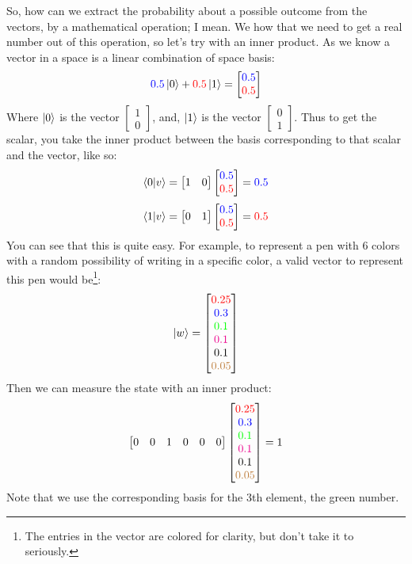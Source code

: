 So, how can we extract the probability about a possible outcome from the vectors, by a mathematical operation; I mean. We how that we need to get a real number out of this operation, so let's try with an inner product.
As we know a vector in a space is a linear combination of space basis:
$$
\textcolor{blue}{0.5}\ket{0} + \textcolor{red}{0.5}\ket{1} = \begin{bmatrix}
	\textcolor{blue}{0.5} \\
	\textcolor{red}{0.5}
\end{bmatrix}
$$
Where $\ket{0}$ is the vector $\begin{bmatrix} 1 \\ 0\end{bmatrix}$, and, $\ket{1}$ is the vector $\begin{bmatrix} 0 \\ 1 \end{bmatrix}$. Thus to get the scalar, you take the inner product between the basis corresponding to that scalar and the vector, like so:
$$
\bra{0}\ket{v} =
\begin{bmatrix}
	1 &
	0
\end{bmatrix}
\begin{bmatrix}
	\textcolor{blue}{0.5} \\
	\textcolor{red}{0.5}
\end{bmatrix}
= \textcolor{blue}{0.5}
$$
$$
\bra{1}\ket{v} =
	\begin{bmatrix}
		0 &
		1
	\end{bmatrix}
	\begin{bmatrix}
		\textcolor{blue}{0.5} \\
		\textcolor{red}{0.5}
	\end{bmatrix}
	= \textcolor{red}{0.5}
$$
You can see that this is quite easy. For example, to represent a pen with 6 colors with a random possibility of writing in a specific color, a valid vector to represent this pen would be\footnote{The entries in the vector are colored for clarity, but don't take it to seriously.}:
$$
\ket{w} =
\begin{bmatrix}
	\textcolor{red}{0.25} \\
	\textcolor{blue}{0.3 }\\
	\textcolor{green}{0.1 }\\
	\textcolor{magenta}{0.1 }\\
	\textcolor{black}{0.1 }\\
	\textcolor{brown}{0.05}
\end{bmatrix}
$$
Then we can measure the state with an inner product:
$$
\begin{bmatrix}
	0 & 0 & 1 & 0 & 0 & 0\\
\end{bmatrix}
\begin{bmatrix}
	\textcolor{red}{0.25} \\
	\textcolor{blue}{0.3 }\\
	\textcolor{green}{0.1 }\\
	\textcolor{magenta}{0.1 }\\
	\textcolor{black}{0.1 }\\
	\textcolor{brown}{0.05}
\end{bmatrix} = 1
$$
Note that we use the corresponding basis for the 3th element, the green number.

